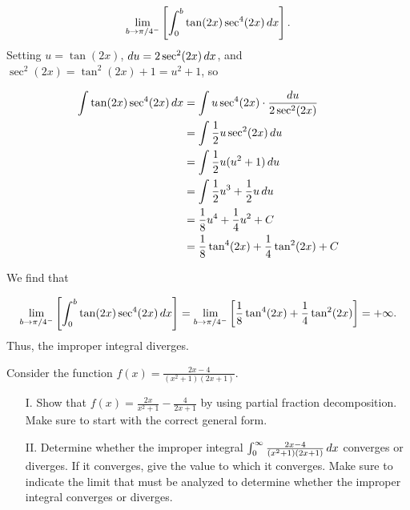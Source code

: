 \documentclass[handout]{ximera}
\begin{document}
\begin{freeResponse}
\[
\lim_{b \to \pi/4^-} \left[\int_0^b  \tan(2x)\sec^4(2x) \mathop{}\!d x \right].
\]
Setting $u = \tan(2x)$, $\mathop{}\!d u = 2 \sec^2(2x) \mathop{}\!d x$, and $\sec^2(2x) = \tan^2(2x)+1 = u^2+1$, so 

\begin{align*}
\int \tan(2x)\sec^4(2x) \mathop{}\!d x &= \int u \sec^4(2x) \cdot \frac{\mathop{}\!d u}{2 \sec^2(2x)} \\
&= \int \frac{1}{2} u \sec^2(2x)\mathop{}\!d u \\
&= \int \frac{1}{2} u(u^2+1) \mathop{}\!d u \\
&= \int \frac{1}{2} u^3+ \frac{1}{2} u \mathop{}\!d u \\
&=  \frac{1}{8} u^4+\frac{1}{4}u^2 +C \\
&=  \frac{1}{8} \tan^4(2x)+\frac{1}{4}\tan^2(2x) +C
\end{align*}

We find that 

\[
\lim_{b \to \pi/4^-} \left[\int_0^b  \tan(2x)\sec^4(2x) \mathop{}\!d x \right] = \lim_{b \to \pi/4^-} \left[ \frac{1}{8} \tan^4(2x)+\frac{1}{4}\tan^2(2x) \right] = + \infty.
\]
Thus, the improper integral diverges.
\end{freeResponse}

\begin{problem}
Consider the function $f(x) = \frac{2x-4}{(x^2+1)(2x+1)}$.

\begin{itemize}
\item[I.] Show that $f(x) = \frac{2x}{x^2+1} - \frac{4}{2x+1}$ by using partial fraction decomposition.  Make sure to start with the correct general form.
\item[II.] Determine whether the improper integral $\int_0^{\infty} \frac{2x-4}{(x^2+1)(2x+1)} \mathop{}\!d x$ converges or diverges.  If it converges, give the value to which it converges.  Make sure to indicate the limit that must be analyzed to determine whether the improper integral converges or diverges.
\end{itemize}
\end{problem}
\end{document}
